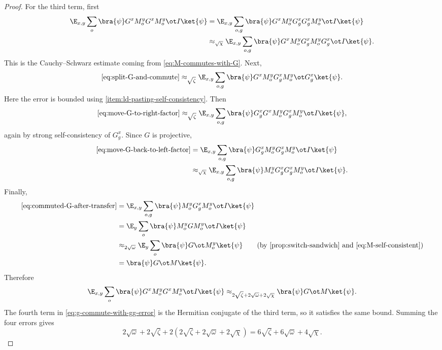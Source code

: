 \begin{proof}
	For the third term, first
	\begin{align}
		\E_{x,y} \sum_o \bra{\psi} G^x M_o^y G^x M_o^y \ot I \ket{\psi}
		 & =
		\E_{x,y} \sum_{o,g} \bra{\psi} G^x M_o^y G_g^x G_g^x M_o^y \ot I \ket{\psi} \nonumber \\
		 & \approx_{\sqrt{\chi}}
		\E_{x,y} \sum_{o,g} \bra{\psi} G^x M_o^y G_g^x M_o^y G_g^x \ot I \ket{\psi}.
		\label{eq:split-G-and-commute}
	\end{align}
	This is the Cauchy--Schwarz estimate coming from \ref{eq:M-commutes-with-G}. Next,
	\begin{equation}\label{eq:move-G-to-right-factor}
		\eqref{eq:split-G-and-commute}
		\approx_{\sqrt{\zeta}}
		\E_{x,y} \sum_{o,g} \bra{\psi} G^x M_o^y G_g^x M_o^y \ot G_g^x \ket{\psi}.
	\end{equation}
	Here the error is bounded using \ref{item:ld-pasting-self-consistency}. Then
	\begin{equation}\label{eq:move-G-back-to-left-factor}
		\eqref{eq:move-G-to-right-factor}
		\approx_{\sqrt{\zeta}}
		\E_{x,y} \sum_{o,g} \bra{\psi} G_g^x G^x M_o^y G_g^x M_o^y \ot I \ket{\psi},
	\end{equation}
	again by strong self-consistency of $G_g^x$. Since $G$ is projective,
	\begin{align}
		\eqref{eq:move-G-back-to-left-factor}
		 & =
		\E_{x,y} \sum_{o,g} \bra{\psi} G_g^x M_o^y G_g^x M_o^y \ot I \ket{\psi} \nonumber \\
		 & \approx_{\sqrt{\chi}}
		\E_{x,y} \sum_{o,g} \bra{\psi} M_o^y G_g^x G_g^x M_o^y \ot I \ket{\psi}.
		\label{eq:commuted-G-after-transfer}
	\end{align}
	Finally,
	\begin{align*}
		\eqref{eq:commuted-G-after-transfer}
		 & =
		\E_{x,y} \sum_{o,g} \bra{\psi} M_o^y G_g^x M_o^y \ot I \ket{\psi}         \\
		 & =
		\E_y \sum_o \bra{\psi} M_o^y G M_o^y \ot I \ket{\psi}                     \\
		 & \approx_{2\sqrt{\omega}} \E_y \sum_o \bra{\psi} G \ot M_o^y \ket{\psi}
		\tag{by \ref{prop:switch-sandwich} and \ref{eq:M-self-consistent}}        \\
		 & =
		\bra{\psi} G \ot M \ket{\psi}.
	\end{align*}
	Therefore
	\begin{equation}\label{eq:third-error-term-bound}
		\E_{x,y} \sum_o \bra{\psi} G^x M_o^y G^x M_o^y \ot I \ket{\psi}
		\approx_{2\sqrt{\zeta}+2\sqrt{\omega}+2\sqrt{\chi}}
		\bra{\psi} G \ot M \ket{\psi}.
	\end{equation}
	The fourth term in \ref{eq:g-commute-with-gg-error} is the Hermitian conjugate of the third term, so it satisfies the same bound. Summing the four errors gives
	\[
		2\sqrt{\omega}+2\sqrt{\zeta}+2(2\sqrt{\zeta}+2\sqrt{\omega}+2\sqrt{\chi})
		=
		6\sqrt{\zeta}+6\sqrt{\omega}+4\sqrt{\chi}.
	\]
\end{proof}
